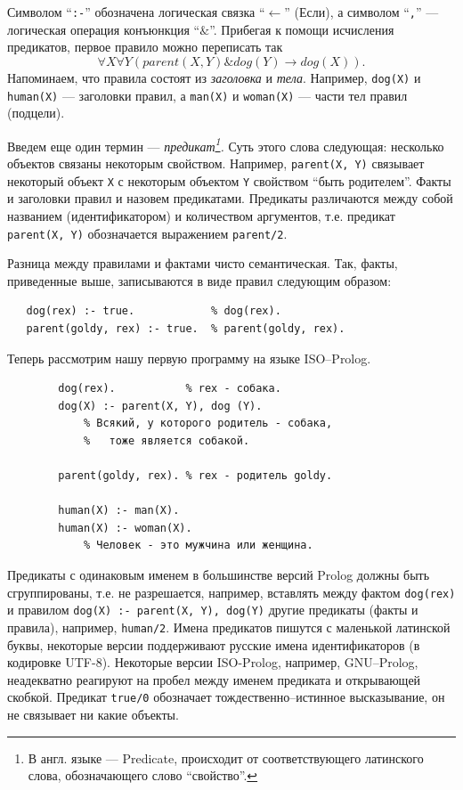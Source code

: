 \documentclass[12pt, openany, twoside]{book} %
\begin{document}
\noindent Символом ``{\tt :-}'' обозначена логическая связка ``$\leftarrow$'' (Если), а символом ``{\tt ,}'' --- логическая операция конъюнкция ``$\&$''. Прибегая к помощи исчисления предикатов, первое правило можно переписать так
$$
    \forall X \forall Y (parent(X, Y) \& dog(Y) \to dog(X)).
$$
Напоминаем, что правила состоят из {\em заголовка} и {\em тела}. Например, {\tt dog(X)} и {\tt human(X)} --- заголовки правил, а {\tt man(X)} и {\tt woman(X)} --- части тел правил (подцели).

Введем еще один термин --- {\em предикат\footnote{В англ. языке --- Predicate, происходит от соответствующего латинского слова, обозначающего слово ``свойство''.}.} Суть этого слова следующая: несколько объектов связаны некоторым свойством. Например, {\tt parent(X, Y)} связывает некоторый объект {\tt X} с некоторым объектом {\tt Y} свойством ``быть родителем''. Факты и заголовки правил и назовем предикатами. Предикаты различаются между собой названием (идентификатором) и количеством аргументов, т.е. предикат {\tt parent(X, Y)} обозначается выражением {\tt parent/2}.

Разница между правилами и фактами чисто семантическая. Так, факты, приведенные выше, записываются в виде правил следующим образом:
{\tt\begin{verbatim}
   dog(rex) :- true.            % dog(rex).
   parent(goldy, rex) :- true.  % parent(goldy, rex).
\end{verbatim}}

Теперь рассмотрим нашу первую программу на языке ISO--Prolog.
{\tt\begin{verbatim}
        dog(rex).           % rex - собака.
        dog(X) :- parent(X, Y), dog (Y).
            % Всякий, у которого родитель - собака,
            %   тоже является собакой.

        parent(goldy, rex). % rex - родитель goldy.

        human(Х) :- man(Х).
        human(Х) :- woman(Х).
            % Человек - это мужчина или женщина.
\end{verbatim}}
Предикаты с одинаковым именем в большинстве версий Prolog должны быть сгруппированы, т.е. не разрешается, например, вставлять между фактом {\tt dog(rex)} и правилом {\tt dog(X) :- parent(X, Y), dog(Y)} другие предикаты (факты и правила), например, {\tt human/2}. Имена предикатов пишутся с маленькой латинской буквы, некоторые версии поддерживают русские имена идентификаторов (в кодировке UTF-8). Некоторые версии ISO-Prolog, например, GNU--Prolog, неадекватно реагируют на пробел между именем предиката и открывающей скобкой.  Предикат {\tt true/0} обозначает тождественно--истинное высказывание, он не связывает ни какие объекты.
\end{document}
